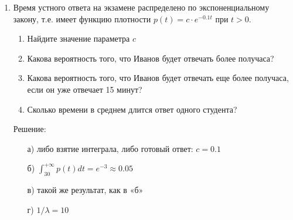 \documentclass[12pt, a4paper]{article}\usepackage[]{graphicx}\usepackage[]{color}
\begin{document}
\begin{enumerate}
\item Время устного ответа на экзамене распределено по экспоненциальному закону, т.е. имеет функцию плотности $p(t)=c\cdot e^{-0.1t}$ при $t>0$.
\begin{enumerate}
\item Найдите значение параметра $c$
\item Какова вероятность того, что Иванов будет отвечать более получаса?
\item Какова вероятность того, что Иванов будет отвечать еще более получаса, если он уже отвечает 15 минут?
\item Сколько времени в среднем длится ответ одного студента?
\end{enumerate}
Решение:
\begin{enumerate}
\item[а)] либо взятие интеграла, либо готовый ответ: $c=0.1$
\item[б)] $\int_{30}^{+\infty}p(t)dt=e^{-3}\approx 0.05$
\item[в)] такой же результат, как в «б»
\item[г)] $1/\lambda=10$
\end{enumerate}






\end{enumerate}
\end{document}
